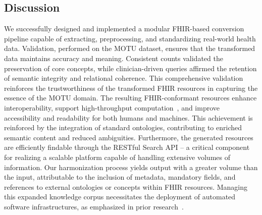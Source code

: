 
\subsection{Discussion}\label{sec:paper2_discussion}
We successfully designed and implemented a modular FHIR-based conversion pipeline capable of extracting, preprocessing, and standardizing real-world health data.
Validation, performed on the MOTU dataset, ensures that the transformed data maintains accuracy and meaning. Consistent counts validated the preservation of core concepts, while clinician-driven queries affirmed the retention of semantic integrity and relational coherence. This comprehensive validation reinforces the trustworthiness of the transformed FHIR resources in capturing the essence of the MOTU domain. The resulting FHIR-conformant resources enhance interoperability, support high-throughput computation~\cite{hong_developing_2019}, and improve accessibility and readability for both humans and machines. This achievement is reinforced by the integration of standard ontologies, contributing to enriched semantic content and reduced ambiguities. Furthermore, the generated resources are efficiently findable through the RESTful Search API – a critical component for realizing a scalable platform capable of handling extensive volumes of information. Our harmonization process yields output with a greater volume than the input, attributable to the inclusion of metadata, mandatory fields, and references to external ontologies or concepts within FHIR resources. Managing this expanded knowledge corpus necessitates the deployment of automated software infrastructures, as emphasized in prior research~\cite{gehrmann_what_2023}. 

